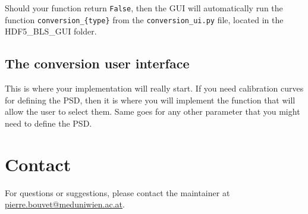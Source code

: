 \documentclass[a4paper,12pt]{article}
\begin{document}
Should your function return \texttt{False}, then the GUI will automatically run the function \texttt{conversion\_\{type\}} from the \texttt{conversion\_ui.py} file, located in the HDF5\_BLS\_GUI folder.  

\subsection{The conversion user interface}

This is where your implementation will really start. If you need calibration curves for defining the PSD, then it is where you will implement the function that will allow the user to select them. Same goes for any other parameter that you might need to define the PSD.



\section{Contact}
For questions or suggestions, please contact the maintainer at \href{mailto:pierre.bouvet@meduniwien.ac.at}{pierre.bouvet@meduniwien.ac.at}.
\end{document}
